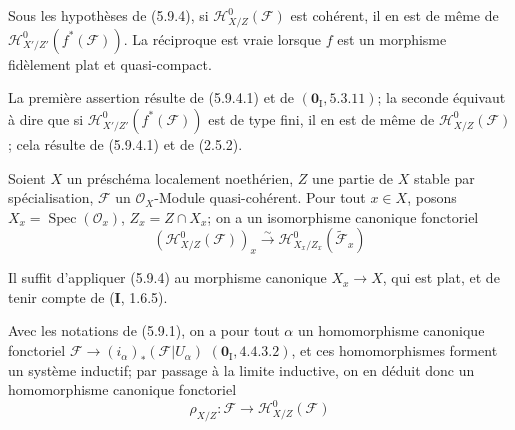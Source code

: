 \begin{corollary}[5.9.5]
\label{IV.2.s5.9.5-fr}
Sous les hypothèses de \textup{(5.9.4)}, si
$\mathcal H^0_{X/Z}(\mathcal F)$ est cohérent, il en est de même de
$\mathcal H^0_{X'/Z'}(f^*(\mathcal F))$. La réciproque est vraie lorsque
$f$ est un morphisme fidèlement plat et quasi-compact.
\end{corollary}

La première assertion résulte de (5.9.4.1) et de $(\mathbf{0}_{\mathrm I},5.3.11)$;
la seconde équivaut à dire que si
$\mathcal H^0_{X'/Z'}(f^*(\mathcal F))$ est de type fini, il en est de même
de $\mathcal H^0_{X/Z}(\mathcal F)$; cela résulte de (5.9.4.1) et de
(2.5.2).

\begin{corollary}[5.9.6]
\label{IV.2.s5.9.6-fr}
Soient $X$ un préschéma localement noethérien, $Z$ une partie de $X$ stable
par spécialisation, $\mathcal F$ un $\mathcal O_X$-Module quasi-cohérent.
Pour tout $x\in X$, posons $X_x=\operatorname{Spec}(\mathcal O_x)$,
$Z_x=Z\cap X_x$; on a un isomorphisme canonique fonctoriel
\begin{equation}
(\mathcal H^0_{X/Z}(\mathcal F))_x
\xrightarrow{\sim}\mathcal H^0_{X_x/Z_x}(\widetilde{\mathcal F}_x)
\tag{5.9.6.1}\label{IV.2.s5.9.6.1-fr}
\end{equation}
\end{corollary}

Il suffit d'appliquer (5.9.4) au morphisme canonique $X_x\to X$, qui est
plat, et de tenir compte de (\textbf{I}, 1.6.5).

\begin{env}[5.9.7]
\label{IV.2.s5.9.7-fr}
Avec les notations de (5.9.1), on a pour tout $\alpha$ un homomorphisme
canonique fonctoriel
$\mathcal F\longrightarrow(i_\alpha)_*(\mathcal F|U_\alpha)$
$(\mathbf{0}_{\mathrm I},4.4.3.2)$,
et ces homomorphismes forment un système inductif; par passage à la limite
inductive, on en déduit donc un homomorphisme canonique fonctoriel
\begin{equation}
\rho_{X/Z}:\mathcal F\longrightarrow\mathcal H^0_{X/Z}(\mathcal F)
\tag{5.9.7.1}\label{IV.2.s5.9.7.1-fr}
\end{equation}
\end{env}

